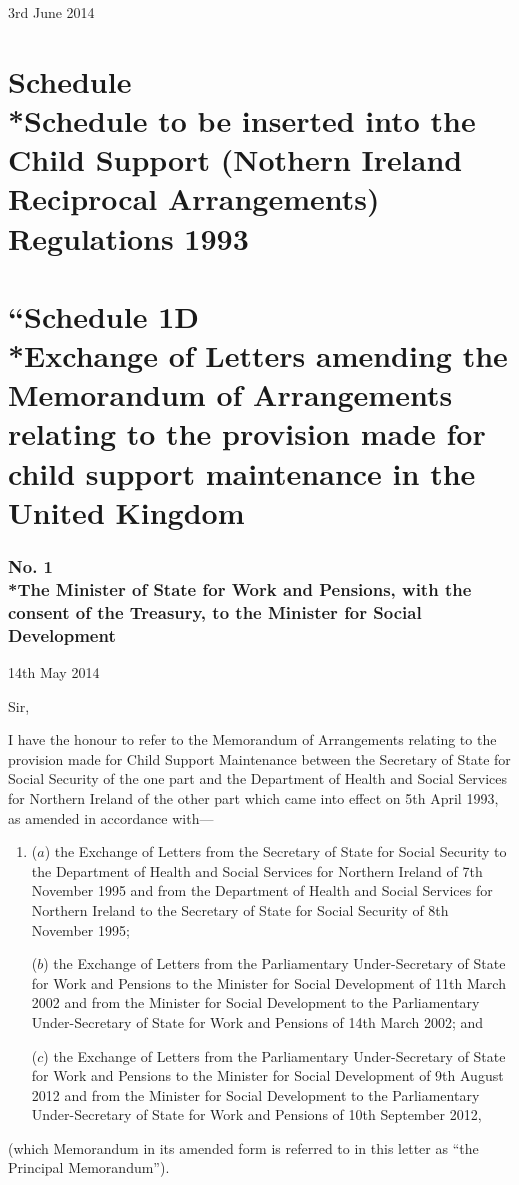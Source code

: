\documentclass[12pt,a4paper]{article}
\begin{document}
3rd June 2014

\small

\clearpage

\part[Schedule --- Schedule to be inserted into the  Child Support (Nothern Ireland Reciprocal Arrangements) Regulations 1993]{Schedule\\*Schedule to be inserted into the  Child Support (Nothern Ireland Reciprocal Arrangements) Regulations 1993}

\renewcommand\parthead{--- Schedule}

\part*{``Schedule 1D\\*Exchange of Letters amending the Memorandum of Arrangements relating to the provision made for child support maintenance in the United Kingdom}

\section*{No. 1\\*The Minister of State for Work and Pensions, with the consent of the Treasury, to the Minister for Social Development}

14th May 2014

Sir,

I have the honour to refer to the Memorandum of Arrangements relating to the provision 
made for Child Support Maintenance between the Secretary of State for Social Security of 
the one part and the Department of Health and Social Services for Northern Ireland of the 
other part which came into effect on 5th April 1993, as amended in accordance with---
\begin{enumerate}\item[] 
($a$) the Exchange of Letters from the Secretary of State for Social Security to the 
Department of Health and Social Services for Northern Ireland of 7th November 
1995 and from the Department of Health and Social Services for Northern Ireland 
to the Secretary of State for Social Security of 8th November 1995;

($b$) the Exchange of Letters from the Parliamentary Under-Secretary of State for Work
and Pensions to the Minister for Social Development of 11th March 2002 and from
the Minister for Social Development to the Parliamentary Under-Secretary of State
for Work and Pensions of 14th March 2002; and

($c$) the Exchange of Letters from the Parliamentary Under-Secretary of State for Work
and Pensions to the Minister for Social Development of 9th August 2012 and from
the Minister for Social Development to the Parliamentary Under-Secretary of State
for Work and Pensions of 10th September 2012,
\end{enumerate}
(which Memorandum in its amended form is referred to in this letter as ``the Principal
Memorandum'').
\end{document}
